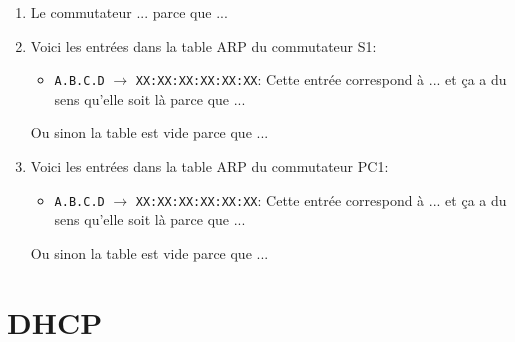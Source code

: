\documentclass[]{article}
\begin{document}
\begin{enumerate}
    \item Le commutateur ... parce que ...
    \item Voici les entrées dans la table ARP du commutateur S1:
    
    \begin{itemize}
        \item \texttt{A.B.C.D} $\rightarrow$ \texttt{XX:XX:XX:XX:XX:XX}: Cette entrée correspond
              à ... et ça a du sens qu'elle soit là parce que ...
    \end{itemize}

    Ou sinon la table est vide parce que ...
    \item Voici les entrées dans la table ARP du commutateur PC1:
    
    \begin{itemize}
        \item \texttt{A.B.C.D} $\rightarrow$ \texttt{XX:XX:XX:XX:XX:XX}: Cette entrée correspond
              à ... et ça a du sens qu'elle soit là parce que ...
    \end{itemize}

    Ou sinon la table est vide parce que ...
\end{enumerate}

\section*{DHCP}
\end{document}
